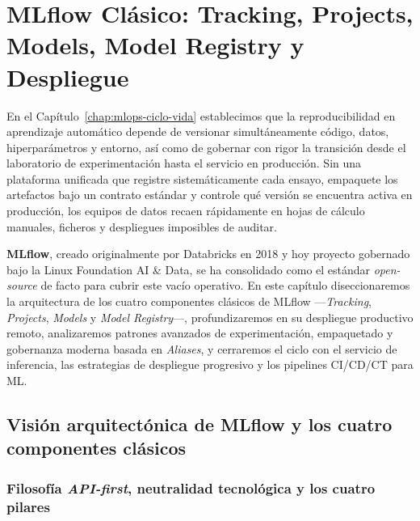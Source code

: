 
\chapter[MLflow Clásico: Tracking, Models y Registry]{MLflow Clásico: Tracking, Projects, Models, Model Registry y Despliegue}\label{chap:mlflow-clasico}

En el Capítulo~\ref{chap:mlops-ciclo-vida} establecimos que la reproducibilidad en aprendizaje automático depende de versionar simultáneamente código, datos, hiperparámetros y entorno, así como de gobernar con rigor la transición desde el laboratorio de experimentación hasta el servicio en producción. Sin una plataforma unificada que registre sistemáticamente cada ensayo, empaquete los artefactos bajo un contrato estándar y controle qué versión se encuentra activa en producción, los equipos de datos recaen rápidamente en hojas de cálculo manuales, ficheros  y despliegues imposibles de auditar.

\textbf{MLflow}, creado originalmente por Databricks en 2018 y hoy proyecto gobernado bajo la Linux Foundation AI \& Data, se ha consolidado como el estándar \textit{open-source} de facto para cubrir este vacío operativo. En este capítulo diseccionaremos la arquitectura de los cuatro componentes clásicos de MLflow ---\textit{Tracking}, \textit{Projects}, \textit{Models} y \textit{Model Registry}---, profundizaremos en su despliegue productivo remoto, analizaremos patrones avanzados de experimentación, empaquetado  y gobernanza moderna basada en \textit{Aliases}, y cerraremos el ciclo con el servicio de inferencia, las estrategias de despliegue progresivo y los pipelines CI/CD/CT para ML.

\section[Arquitectura de MLflow y componentes]{Visión arquitectónica de MLflow y los cuatro componentes clásicos}\label{sec:mlflow-arquitectura}

\subsection{Filosofía \textit{API-first}, neutralidad tecnológica y los cuatro pilares}

